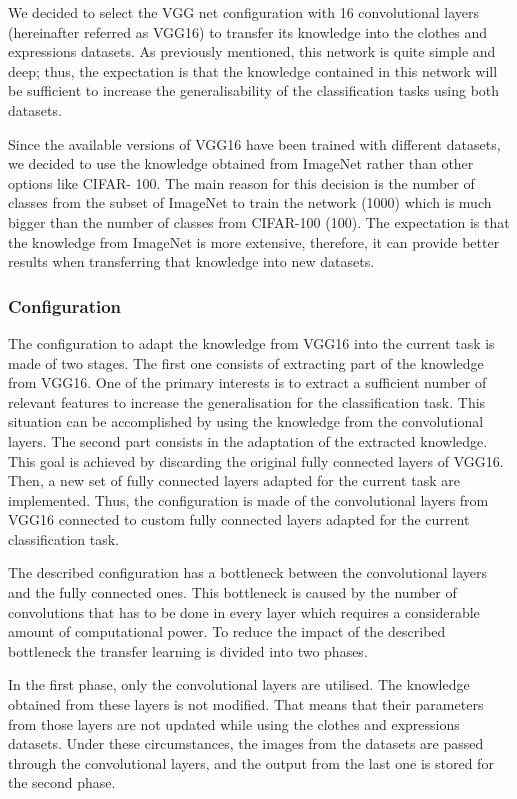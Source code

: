\documentclass{article}
\begin{document}
We decided to select the VGG net configuration with 16 convolutional layers (hereinafter referred as VGG16) to transfer its knowledge into the clothes and expressions datasets. As previously mentioned, this network is quite simple and deep; thus, the expectation is that the knowledge contained in this network will be sufficient to increase the generalisability of the classification tasks using both datasets.

Since the available versions of VGG16 have been trained with different datasets, we decided to use the knowledge obtained from ImageNet rather than other options like CIFAR- 100. The main reason for this decision is the number of classes from the subset of ImageNet to train the network (1000) which is much bigger than the number of classes from CIFAR-100 (100). The expectation is that the knowledge from ImageNet is more extensive, therefore, it can provide better results when transferring that knowledge into new datasets.

\subsubsection{\textbf{Configuration}}

The configuration to adapt the knowledge from VGG16 into the current task is made of two stages. The first one consists of extracting part of the knowledge from VGG16. One of the primary interests is to extract a sufficient number of relevant features to increase the generalisation for the classification task. This situation can be accomplished by using the knowledge from the convolutional layers. The second part consists in the adaptation of the extracted knowledge. This goal is achieved by discarding the original fully connected layers of VGG16. Then, a new set of fully connected layers adapted for the current task are implemented. Thus, the configuration is made of the convolutional layers from VGG16 connected to custom fully connected layers adapted for the current classification task.

The described configuration has a bottleneck between the convolutional layers and the fully connected ones. This bottleneck is caused by the number of convolutions that has to be done in every layer which requires a considerable amount of computational power. To reduce the impact of the described bottleneck the transfer learning is divided into two phases.

In the first phase, only the convolutional layers are utilised. The knowledge obtained from these layers is not modified. That means that their parameters from those layers are not updated while using the clothes and expressions datasets. Under these circumstances, the images from the datasets are passed through the convolutional layers, and the output from the last one is stored for the second phase.
\end{document}

